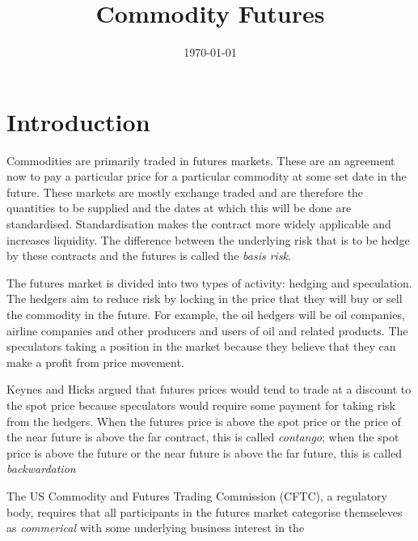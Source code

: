 \documentclass[12pt, a4paper, oneside]{article}\usepackage[]{graphicx}\usepackage[]{color}
\begin{document}
\title{Commodity Futures}
\date{\today}
\maketitle
\section*{Introduction}
Commodities are primarily traded in futures markets.  These are an agreement now to pay a particular price for a particular commodity at some set date in the future. These markets are mostly exchange traded and are therefore the quantities to be supplied and the dates at which this will be done are standardised.  Standardisation makes the contract more widely applicable and increases liquidity.  The difference between the underlying risk that is to be hedge by these contracts and the futures is called the \emph{basis risk}.  

The futures market is divided into two types of activity:  hedging and speculation.  The hedgers aim to reduce risk by locking in the price that they will buy or sell the commodity in the future.  For example, the oil hedgers will be oil companies, airline companies and other producers and users of oil and related products. The speculators taking a position in the market because they believe that they can make a profit from price movement. 

Keynes and Hicks argued that futures prices would tend to trade at a discount to the spot price because speculators would require some payment for taking risk from the hedgers. When the futures price is above the spot price or the price of the near future is above the far contract, this is called \emph{contango}; when the spot price is above the future or the near future is above the far future, this is called \emph{backwardation}

The US Commodity and Futures Trading Commission (CFTC), a regulatory body, requires that all participants in the futures market categorise themseleves as \emph{commerical} with some underlying business interest in the 
\end{document}
